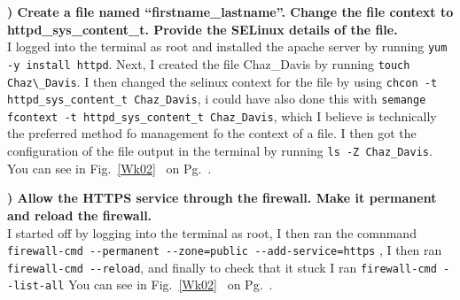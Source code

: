 \documentclass{report}
\newcommand{\mysubsection}[2]{\textbf{\romannumeral #1) #2}}
\begin{document}
\noindent\mysubsection{4}{Create a file named “firstname\_lastname”. Change the
file context to httpd\_sys\_content\_t.  Provide the SELinux details of the file.}\\
I logged into the terminal as root and installed the apache server by running
{\scriptsize{\verb$yum -y install httpd$}\normalsize}. Next, I created the file
Chaz\_Davis by running {\scriptsize{\verb$touch Chaz\_Davis$}\normalsize}. I
then changed the selinux context for the file by using
{\scriptsize{\verb$chcon -t httpd_sys_content_t Chaz_Davis$}\normalsize}, i
could have also done this with 
{\scriptsize{\verb$semange fcontext -t httpd_sys_content_t Chaz_Davis$}\normalsize},
which I believe is technically the preferred method fo management fo the
context of a file. I then got the configuration of the file output in the
terminal by running
{\scriptsize{\verb$ls -Z Chaz_Davis$}\normalsize}. You can see in
Fig.~\ref{Wk02}~ 
on Pg.~\pageref{Wk02}.



\noindent\mysubsection{5}{Allow the HTTPS service through the firewall. Make it permanent and reload the firewall. }\\
I started off by logging into the terminal as root, I then ran the comnmand
{\scriptsize{\verb$firewall-cmd --permanent --zone=public --add-service=https$}\normalsize} 
, I then ran {\scriptsize{\verb$firewall-cmd --reload$}\normalsize}, and
finally to check that it stuck I ran {\scriptsize{\verb$firewall-cmd --list-all$}\normalsize} 
You can see in Fig.~\ref{Wk02}~ 
on Pg.~\pageref{Wk02}.
\end{document}
